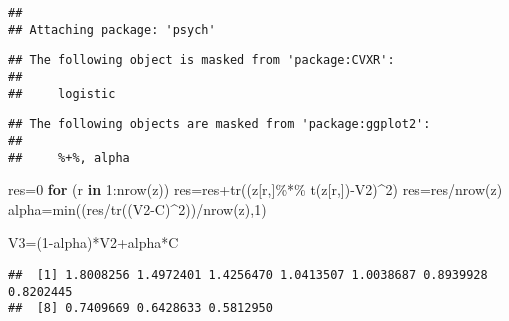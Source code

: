 \documentclass[
]{article}
\newenvironment{Shaded}{\begin{snugshade}}{\end{snugshade}}
\newcommand{\ControlFlowTok}[1]{\textcolor[rgb]{0.13,0.29,0.53}{\textbf{#1}}}
\newcommand{\DecValTok}[1]{\textcolor[rgb]{0.00,0.00,0.81}{#1}}
\newcommand{\FunctionTok}[1]{\textcolor[rgb]{0.00,0.00,0.00}{#1}}
\newcommand{\NormalTok}[1]{#1}
\newcommand{\OtherTok}[1]{\textcolor[rgb]{0.56,0.35,0.01}{#1}}
\newcommand{\SpecialCharTok}[1]{\textcolor[rgb]{0.00,0.00,0.00}{#1}}
\begin{document}
\begin{verbatim}
## 
## Attaching package: 'psych'
\end{verbatim}

\begin{verbatim}
## The following object is masked from 'package:CVXR':
## 
##     logistic
\end{verbatim}

\begin{verbatim}
## The following objects are masked from 'package:ggplot2':
## 
##     %+%, alpha
\end{verbatim}

\begin{Shaded}
\begin{Highlighting}[]
\NormalTok{res}\OtherTok{=}\DecValTok{0}
\ControlFlowTok{for}\NormalTok{ (r }\ControlFlowTok{in} \DecValTok{1}\SpecialCharTok{:}\FunctionTok{nrow}\NormalTok{(z))}
\NormalTok{  res}\OtherTok{=}\NormalTok{res}\SpecialCharTok{+}\FunctionTok{tr}\NormalTok{((z[r,]}\SpecialCharTok{\%*\%} \FunctionTok{t}\NormalTok{(z[r,])}\SpecialCharTok{{-}}\NormalTok{V2)}\SpecialCharTok{\^{}}\DecValTok{2}\NormalTok{)}
\NormalTok{  res}\OtherTok{=}\NormalTok{res}\SpecialCharTok{/}\FunctionTok{nrow}\NormalTok{(z)}
\NormalTok{alpha}\OtherTok{=}\FunctionTok{min}\NormalTok{((res}\SpecialCharTok{/}\FunctionTok{tr}\NormalTok{((V2}\SpecialCharTok{{-}}\NormalTok{C)}\SpecialCharTok{\^{}}\DecValTok{2}\NormalTok{))}\SpecialCharTok{/}\FunctionTok{nrow}\NormalTok{(z),}\DecValTok{1}\NormalTok{)}
\end{Highlighting}
\end{Shaded}

\begin{Shaded}
\begin{Highlighting}[]
\NormalTok{V3}\OtherTok{=}\NormalTok{(}\DecValTok{1}\SpecialCharTok{{-}}\NormalTok{alpha)}\SpecialCharTok{*}\NormalTok{V2}\SpecialCharTok{+}\NormalTok{alpha}\SpecialCharTok{*}\NormalTok{C}
\end{Highlighting}
\end{Shaded}

\begin{Shaded}
\end{Shaded}

\begin{verbatim}
##  [1] 1.8008256 1.4972401 1.4256470 1.0413507 1.0038687 0.8939928 0.8202445
##  [8] 0.7409669 0.6428633 0.5812950
\end{verbatim}
\end{document}
